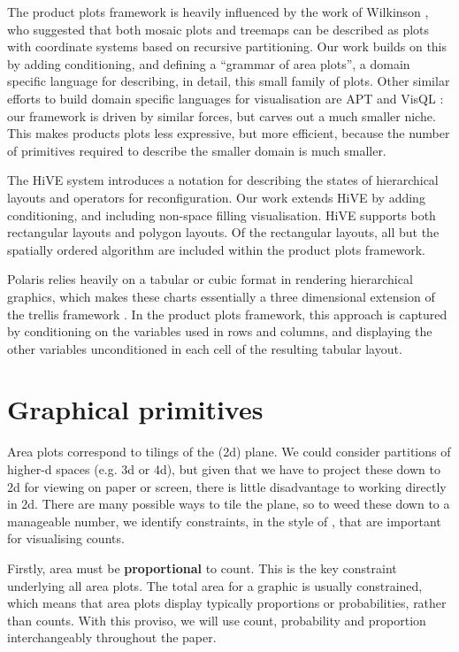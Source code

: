 \documentclass[journal]{vgtc}
\begin{document}
The product plots framework is heavily influenced by the work of Wilkinson \citep{wilkinson:1999, wilkinson:2005}, who suggested that both mosaic plots and treemaps can be described as plots with coordinate systems based on recursive partitioning. Our work builds on this by adding conditioning, and defining a ``grammar of area plots'', a domain specific language for describing, in detail, this small family of plots. Other similar efforts to build domain specific languages for visualisation are APT \citep{mackinlay:1986} and VisQL \citep{mackinlay:2007}: our framework is driven by similar forces, but carves out a much smaller niche. This makes products plots less expressive, but more efficient, because the number of primitives required to describe the smaller domain is much smaller.

The HiVE system \citep{slingsby:2009} introduces a notation for describing the states of hierarchical layouts and operators for reconfiguration. Our work extends HiVE by adding conditioning, and including non-space filling visualisation. HiVE supports both rectangular layouts and polygon layouts. Of the rectangular layouts, all but the spatially ordered algorithm are included within the product plots framework.

Polaris \cite{stolte:2002} relies heavily on a tabular or cubic format in rendering hierarchical graphics, which makes these charts essentially a three dimensional extension of the trellis framework \citep{cleveland:1994,becker:1996}. In the product plots framework, this approach is captured by conditioning on the variables used in rows and columns, and displaying the other variables unconditioned in each cell of the resulting tabular layout.

\section{Graphical primitives}
\label{sec:primitives}

Area plots correspond to tilings of the (2d) plane. We could consider partitions of higher-d spaces (e.g. 3d or 4d), but given that we have to project these down to 2d for viewing on paper or screen, there is little disadvantage to working directly in 2d. There are many possible ways to tile the plane, so to weed these down to a manageable number, we identify  constraints, in the style of \citep{keim:2002}, that are important for visualising counts.

Firstly, area must be {\bf proportional} to count. This is the key constraint underlying all area plots. The total area for a graphic is usually constrained, which means that area plots display typically proportions or probabilities, rather than counts. With this proviso, we will use count, probability and proportion interchangeably throughout the paper.
\end{document}
